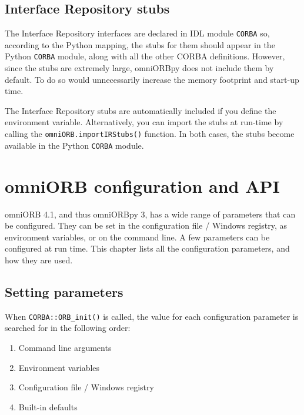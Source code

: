 \documentclass[draft,11pt,twoside,a4paper]{book}
\newcommand{\module}[1]{\texttt{#1}}
\newcommand{\op}[1]{\texttt{#1()}}
\newcommand{\envvar}{\begingroup \urlstyle{tt}\Url}
\begin{document}
\section{Interface Repository stubs}
\label{sec:ifrstubs}

The Interface Repository interfaces are declared in IDL module
\module{CORBA} so, according to the Python mapping, the stubs for them
should appear in the Python \module{CORBA} module, along with all the
other CORBA definitions. However, since the stubs are extremely large,
omniORBpy does not include them by default. To do so would
unnecessarily increase the memory footprint and start-up time.

The Interface Repository stubs are automatically included if you
define the \envvar{OMNIORBPY_IMPORT_IR_STUBS} environment variable.
Alternatively, you can import the stubs at run-time by calling the
\op{omniORB.importIRStubs} function. In both cases, the stubs become
available in the Python \module{CORBA} module.



\chapter{omniORB configuration and API}
\label{chap:config}

omniORB 4.1, and thus omniORBpy 3, has a wide range of parameters that
can be configured. They can be set in the configuration file / Windows
registry, as environment variables, or on the command line. A few
parameters can be configured at run time. This chapter lists all the
configuration parameters, and how they are used.

\section{Setting parameters}

When \op{CORBA::ORB\_init} is called, the value for each configuration
parameter is searched for in the following order:

\begin{enumerate}

\item Command line arguments
\item Environment variables
\item Configuration file / Windows registry
\item Built-in defaults

\end{enumerate}
\end{document}
